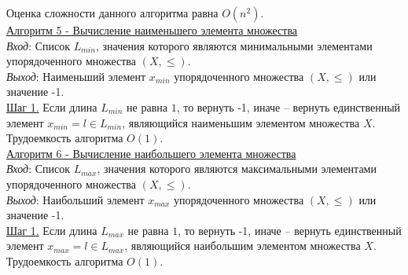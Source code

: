 \documentclass[bachelor, och, labwork]{shiza}
\begin{document}
            Оценка сложности данного алгоритма равна $O(n^2)$.\\

            

        \underline{Алгоритм 5 - Вычисление наименьшего элемента множества}\\
            \textit{Вход}: Список $L_{min}$, значения которого являются минимальными элементами упорядоченного множества $(X, \leq)$.\\
            \textit{Выход}: Наименьший элемент $x_{min}$ упорядоченного множества $(X, \leq)$ или значение -1.\\
            \underline{Шаг 1.} Если длина $L_{min}$ не равна $1$, то вернуть -1, иначе -- вернуть единственный элемент $x_{min} = l \in L_{min}$,
            являющийся наименьшим элементом множества $X$.\\
                
            Трудоемкость алгоритма $O(1)$.\\

        \underline{Алгоритм 6 - Вычисление наибольшего элемента множества}\\
            \textit{Вход}: Список $L_{max}$, значения которого являются максимальными элементами упорядоченного множества $(X, \leq)$.\\
            \textit{Выход}: Наибольший элемент $x_{max}$ упорядоченного множества $(X, \leq)$ или значение -1.\\
            \underline{Шаг 1.} Если длина $L_{max}$ не равна $1$, то вернуть -1, иначе -- вернуть единственный элемент
            $x_{max} = l \in L_{max}$, являющийся наибольшим элементом множества $X$.\\
                
            Трудоемкость алгоритма $O(1)$.\\
\end{document}
